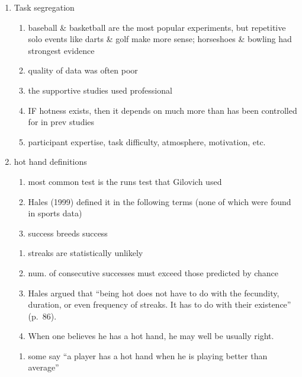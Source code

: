 \documentclass[12pt,twoside]{dukestatscithesis}
\providecommand{\tightlist}{%
  \setlength{\itemsep}{0pt}\setlength{\parskip}{0pt}}
\theoremstyle{definition}
\theoremstyle{definition}
\theoremstyle{definition}
\theoremstyle{remark}
\begin{document}
\begin{enumerate}
\def\labelenumi{\arabic{enumi}.}
\tightlist
\item
  Task segregation
  \begin{enumerate}
  \def\labelenumii{\alph{enumii}.}
  \tightlist
  \item
    baseball \& basketball are the most popular experiments, but
    repetitive solo events like darts \& golf make more sense;
    horseshoes \& bowling had strongest evidence
  \item
    quality of data was often poor
  \item
    the supportive studies used professional
  \item
    IF hotness exists, then it depends on much more than has been
    controlled for in prev studies
  \item
    participant expertise, task difficulty, atmosphere, motivation, etc.
  \end{enumerate}
\item
  hot hand definitions
  \begin{enumerate}
  \def\labelenumii{\alph{enumii}.}
  \tightlist
  \item
    most common test is the runs test that Gilovich used
  \item
    Hales (1999) defined it in the following terms (none of which were
    found in sports data)
  \item
    success breeds success
  \end{enumerate}
  \begin{enumerate}
  \def\labelenumii{\roman{enumii}.}
  \setcounter{enumii}{1}
  \tightlist
  \item
    streaks are statistically unlikely
  \item
    num. of consecutive successes must exceed those predicted by chance
  \item
    Hales argued that ``being hot does not have to do with the
    fecundity, duration, or even frequency of streaks. It has to do with
    their existence'' (p.~86).
  \item
    When one believes he has a hot hand, he may well be usually right.
  \end{enumerate}
  \begin{enumerate}
  \def\labelenumii{\alph{enumii}.}
  \setcounter{enumii}{4}
  \tightlist
  \item
    some say ``a player has a hot hand when he is playing better than
    average''
  \end{enumerate}

\end{enumerate}
\end{document}

